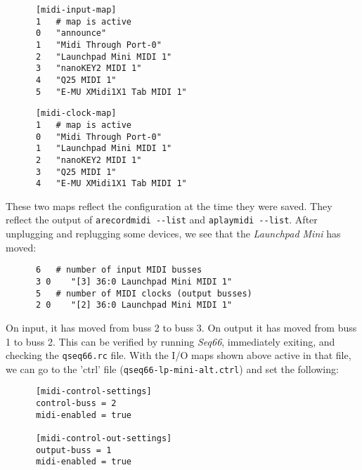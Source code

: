    \begin{verbatim}
      [midi-input-map]
      1   # map is active
      0   "announce"
      1   "Midi Through Port-0"
      2   "Launchpad Mini MIDI 1"
      3   "nanoKEY2 MIDI 1"
      4   "Q25 MIDI 1"
      5   "E-MU XMidi1X1 Tab MIDI 1"
   \end{verbatim}

   \begin{verbatim}
      [midi-clock-map]
      1   # map is active
      0   "Midi Through Port-0"
      1   "Launchpad Mini MIDI 1"
      2   "nanoKEY2 MIDI 1"
      3   "Q25 MIDI 1"
      4   "E-MU XMidi1X1 Tab MIDI 1"
   \end{verbatim}

   These two maps reflect the configuration at the time they were saved.
   They reflect the output of \texttt{arecordmidi -{}-list} and
   \texttt{aplaymidi -{}-list}.
   After unplugging and replugging some devices, we see that the
   \textsl{Launchpad Mini} has moved:

   \begin{verbatim}
      6   # number of input MIDI busses
      3 0    "[3] 36:0 Launchpad Mini MIDI 1"
      5   # number of MIDI clocks (output busses)
      2 0    "[2] 36:0 Launchpad Mini MIDI 1"
   \end{verbatim}

   On input, it has moved from buss 2 to buss 3.
   On output it has moved from buss 1 to buss 2.
   This can be verified by running \textsl{Seq66}, immediately exiting,
   and checking the \texttt{qseq66.rc} file.
   With the I/O maps shown above active in that file,
   we can go to the 'ctrl' file (\texttt{qseq66-lp-mini-alt.ctrl})
   and set the following:

   \begin{verbatim}
      [midi-control-settings]
      control-buss = 2
      midi-enabled = true

      [midi-control-out-settings]
      output-buss = 1
      midi-enabled = true
   \end{verbatim}

